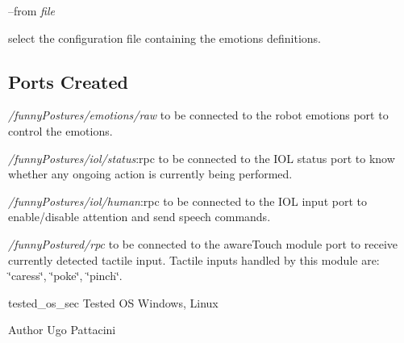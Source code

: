 --from {\itshape file} 
\begin{DoxyItemize}
\item select the configuration file containing the emotions definitions.
\end{DoxyItemize}\hypertarget{group__icub__iCubWriter_portsc_sec}{}\subsection{Ports Created}\label{group__icub__iCubWriter_portsc_sec}
{\itshape /funny\+Postures/emotions/raw} to be connected to the robot emotions port to control the emotions.

{\itshape /funny\+Postures/iol/status}\+:rpc to be connected to the I\+O\+L status port to know whether any ongoing action is currently being performed.

{\itshape /funny\+Postures/iol/human}\+:rpc to be connected to the I\+O\+L input port to enable/disable attention and send speech commands.

{\itshape /funny\+Postured/rpc} to be connected to the aware\+Touch module port to receive currently detected tactile input. Tactile inputs handled by this module are\+: \char`\"{}caress\char`\"{}, \char`\"{}poke\char`\"{}, \char`\"{}pinch\char`\"{}.

tested\+\_\+os\+\_\+sec Tested O\+S Windows, Linux

\begin{DoxyAuthor}{Author}
Ugo Pattacini 
\end{DoxyAuthor}
